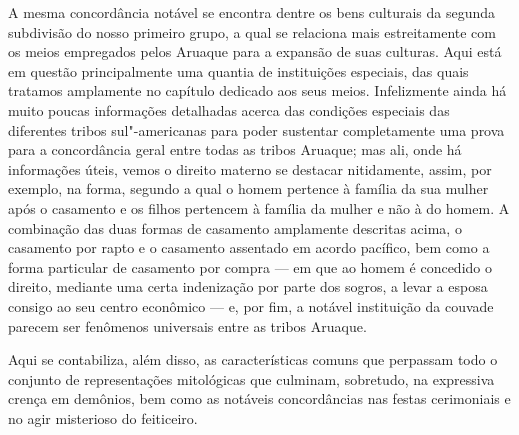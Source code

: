 A mesma concordância notável se encontra dentre os bens culturais da
segunda subdivisão do nosso primeiro grupo, a qual se relaciona mais
estreitamente com os meios empregados pelos Aruaque para a expansão de
suas culturas. Aqui está em questão principalmente uma quantia de
instituições especiais, das quais tratamos amplamente no capítulo
dedicado aos seus meios. Infelizmente ainda há muito poucas informações
detalhadas acerca das condições especiais das diferentes tribos
sul"-americanas para poder sustentar completamente uma prova para a
concordância geral entre todas as tribos Aruaque; mas ali, onde há
informações úteis, vemos o direito materno se destacar nitidamente,
assim, por exemplo, na forma, segundo a qual o homem pertence à família
da sua mulher após o casamento e os filhos pertencem à família da
mulher e não à do homem. A combinação das duas formas de casamento
amplamente descritas acima, o casamento por rapto e o casamento
assentado em acordo pacífico, bem como a forma particular de casamento
por compra --- em que ao homem é concedido o direito, mediante uma certa
indenização por parte dos sogros, a levar a esposa consigo ao seu centro
econômico --- e, por fim, a notável instituição da couvade parecem ser
fenômenos universais entre as tribos Aruaque.

Aqui se contabiliza, além disso, as características comuns que perpassam
todo o conjunto de representações mitológicas que culminam, sobretudo,
na expressiva crença em demônios, bem como as notáveis concordâncias nas
festas cerimoniais e no agir misterioso do feiticeiro.




